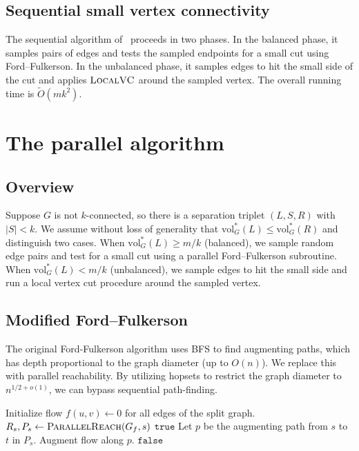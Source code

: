 \documentclass[11pt]{article}
\theoremstyle{remark}
\newcommand{\tildeO}{\widetilde{O}}
\newcommand{\ParallelReach}{\textsc{ParallelReach}}
\newcommand{\LocalVC}{\textsc{LocalVC}}
\newcommand{\SmallCutFF}{\textsc{SmallCutFF}}
\newcommand{\True}{\texttt{true}}
\newcommand{\False}{\texttt{false}}
\newcommand{\vol}{\mathrm{vol}}
\begin{document}
\subsection{Sequential small vertex connectivity}
The sequential algorithm of~\cite{nanongkai2021breakingquadratictimesmall} proceeds in two phases. In the balanced phase, it samples pairs of edges and tests the sampled endpoints for a small cut using Ford--Fulkerson. In the unbalanced phase, it samples edges to hit the small side of the cut and applies \(\LocalVC\) around the sampled vertex. The overall running time is \(\tildeO(mk^2)\).

\section{The parallel algorithm}

\subsection{Overview}
Suppose \(G\) is not \(k\)-connected, so there is a separation triplet \((L,S,R)\) with \(|S|<k\). We assume without loss of generality that \(\vol_G^*(L)\le\vol_G^*(R)\) and distinguish two cases. When \(\vol_G^*(L)\ge m/k\) (balanced), we sample random edge pairs and test for a small cut using a parallel Ford--Fulkerson subroutine. When \(\vol_G^*(L)<m/k\) (unbalanced), we sample edges to hit the small side and run a local vertex cut procedure around the sampled vertex.

\subsection{Modified Ford--Fulkerson}
The original Ford-Fulkerson algorithm uses BFS to find augmenting paths, which has depth proportional to the graph diameter (up to \(O(n)\)). We replace this with parallel reachability. By utilizing hopsets to restrict the graph diameter to \(n^{1/2+o(1)}\), we can bypass sequential path-finding.

\begin{algorithm}[H]
\caption{\(\SmallCutFF(G,s,t,k)\): check if the minimum cut between \(s\) and \(t\) has size \(<k\)}
\label{alg:small-cut-ff}
\begin{algorithmic}[1]
\State Initialize flow \(f(u,v)\gets 0\) for all edges of the split graph.
    \State \(R_s,P_s \gets \ParallelReach(G_f,s)\)
        \State \Return \(\True\) 
    \EndIf
    \State Let \(p\) be the augmenting path from \(s\) to \(t\) in \(P_s\).
    \State Augment flow along \(p\).
\EndFor
\State \Return \(\False\) 
\end{algorithmic}
\end{algorithm}
\end{document}
